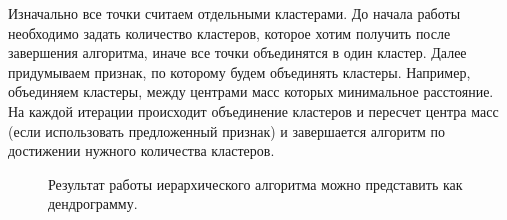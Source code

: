 \documentclass[12pt, a4paper]{article}
\begin{document}
Изначально все точки считаем отдельными кластерами. До начала работы необходимо задать количество кластеров, которое хотим получить после завершения алгоритма, иначе все точки объединятся в один кластер. Далее придумываем признак, по которому будем объединять кластеры. Например, объединяем кластеры, между центрами масс которых минимальное расстояние.
 На каждой итерации происходит объединение кластеров и пересчет центра масс (если использовать предложенный признак) и завершается алгоритм по достижении нужного количества кластеров. 
 \begin{figure}[h!]
\caption{Результат работы иерархического алгоритма можно представить как дендрограмму.}
\label{fig:dbscan}
\end{figure}
\end{document}
